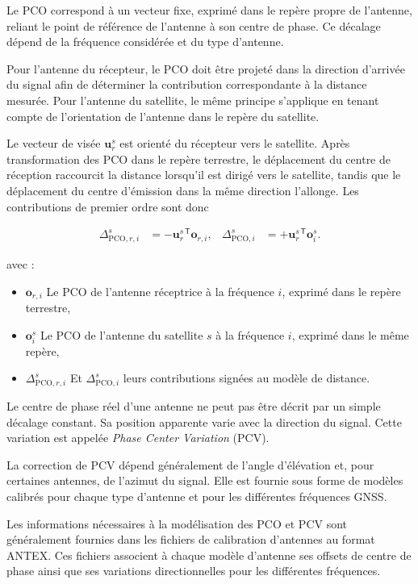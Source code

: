 Le PCO correspond à un vecteur fixe, exprimé dans le
repère propre de l'antenne, reliant le point de référence de l'antenne à son
centre de phase. Ce décalage dépend de la fréquence considérée et du
type d'antenne.

Pour l'antenne du récepteur, le PCO doit être projeté dans la direction
d'arrivée du signal afin de déterminer la contribution correspondante à la
distance mesurée. Pour l'antenne du satellite, le même principe s'applique en
tenant compte de l'orientation de l'antenne dans le repère du satellite.

Le vecteur de visée $\mathbf u_r^s$ est orienté du récepteur vers le satellite.
Après transformation des PCO dans le repère terrestre, le déplacement du
centre de réception raccourcit la distance lorsqu'il est dirigé vers le
satellite, tandis que le déplacement du centre d'émission dans la même
direction l'allonge. Les contributions de premier ordre sont donc

\begin{align}
\Delta_{\mathrm{PCO},r,i}^s
&=-\mathbf u_r^{s\,\mathsf T}\mathbf o_{r,i},
&
\Delta_{\mathrm{PCO},i}^{s}
&=+\mathbf u_r^{s\,\mathsf T}\mathbf o_i^s.
\label{eq:antenna_pco_signs}
\end{align}

avec :

\begin{itemize}
    \item $\mathbf o_{r,i}$ Le PCO de l'antenne réceptrice à la fréquence
    $i$, exprimé dans le repère terrestre,
    \item $\mathbf o_i^s$ Le PCO de l'antenne du satellite $s$ à la fréquence
    $i$, exprimé dans le même repère,
    \item $\Delta_{\mathrm{PCO},r,i}^s$ Et
    $\Delta_{\mathrm{PCO},i}^{s}$ leurs contributions signées au modèle de
    distance.
\end{itemize}


Le centre de phase réel d'une antenne ne peut pas être décrit par un
simple décalage constant. Sa position apparente varie avec la direction du
signal. Cette variation est appelée \textit{Phase Center Variation} (PCV).

La correction de PCV dépend généralement de l'angle d'élévation et, pour
certaines antennes, de l'azimut du signal. Elle est fournie sous forme de
modèles calibrés pour chaque type d'antenne et pour les différentes fréquences
GNSS.

Les informations nécessaires à la modélisation des PCO et PCV sont
généralement fournies dans les fichiers de calibration d'antennes au format
ANTEX. Ces fichiers associent à chaque modèle d'antenne
ses offsets de centre de phase ainsi que ses variations directionnelles pour
les différentes fréquences.



